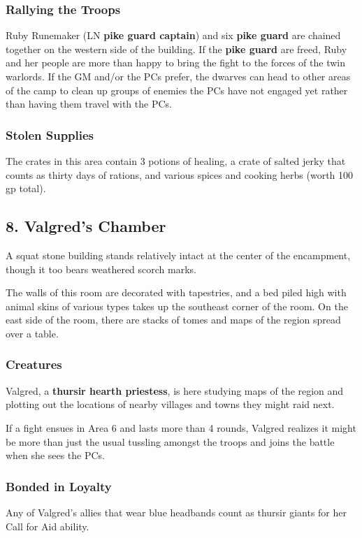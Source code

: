 \documentclass[10pt,a4paper,twoside,bg=print,twocolumn,openany,nodeprecatedcode]{dndbook}
\begin{document}
\subsubsection{Rallying the Troops}
Ruby Runemaker (LN \textbf{pike guard captain}) and six \textbf{pike guard} are chained together on the western side of the building. If the \textbf{pike guard} are freed, Ruby and her people are more than happy to bring the fight to the forces of the twin warlords. If the GM and/or the PCs prefer, the dwarves can head to other areas of the camp to clean up groups of enemies the PCs have not engaged yet rather than having them travel with the PCs.

\subsubsection{Stolen Supplies}
The crates in this area contain 3 potions of healing, a crate of salted jerky that counts as thirty days of rations, and various spices and cooking herbs (worth 100 gp total).

\subsection{8. Valgred's Chamber}
A squat stone building stands relatively intact at the center of the encampment, though it too bears weathered scorch marks.

\begin{DndReadAloud}{}
The walls of this room are decorated with tapestries, and a bed piled high with animal skins of various types takes up the southeast corner of the room. On the east side of the room, there are stacks of tomes and maps of the region spread over a table.

\end{DndReadAloud}

\subsubsection{Creatures}
Valgred, a \textbf{thursir hearth priestess}, is here studying maps of the region and plotting out the locations of nearby villages and towns they might raid next.

If a fight ensues in Area 6 and lasts more than 4 rounds, Valgred realizes it might be more than just the usual tussling amongst the troops and joins the battle when she sees the PCs.

\subsubsection{Bonded in Loyalty}
Any of Valgred's allies that wear blue headbands count as thursir giants for her Call for Aid ability.
\end{document}
